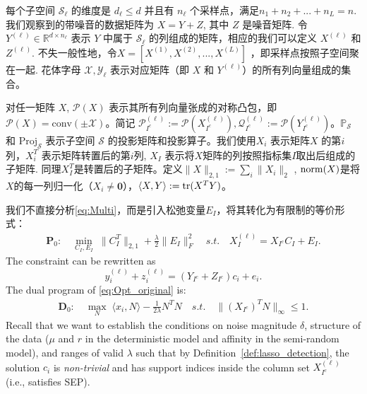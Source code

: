 \documentclass[main.tex]{subfiles}
\begin{document}
每个子空间 $\mathcal{S}_{\ell}$ 的维度是 $d_{\ell} \le d$ 并且有 $n_{\ell}$
个采样点，满足$n_1 +n_2+...+n_L=n$. 我们观察到的带噪音的数据矩阵为 $X = Y+Z$,
其中 $Z$ 是噪音矩阵. 令 $Y^{(\ell)}\in \mathbb{R}^{d\times n_{\ell}}$ 表示 
$Y$ 中属于 $\mathcal{S}_{\ell}$ 的列组成的矩阵，相应的我们可以定义 $X^{(\ell)}$ 和 $Z^{(\ell)}$.
不失一般性地，令$X=[X^{(1)},X^{(2)},...,X^{(L)}]$ ，即采样点按照子空间聚在一起.
花体字母 $\mathcal{X},\mathcal{Y_{\ell}}$ 表示对应矩阵（即 $X$ 和 $Y^{(\ell)}$）的所有列向量组成的集合。

对任一矩阵 $X$, $\mathcal{P}(X)$ 表示其所有列向量张成的对称凸包，即
$\mathcal{P}(X) = \mathrm{conv}(\pm \mathcal{X})$。简记
$\mathcal{P}_{I^c}^{(\ell)} := \mathcal{P}(X_{I^c}^{(\ell)}), \mathcal{Q}_{I^c}^{(\ell)} :=
\mathcal{P}(Y_{I^c}^{(\ell)})$。$\mathbb{P}_{\mathcal{S}}$ 和
$\mathrm{Proj}_{\mathcal{S}}$ 表示子空间 $\mathcal{S}$
的投影矩阵和投影算子。我们使用$X_i$ 表示矩阵$X$ 的第$i$列，$X_i^T$ 表示矩阵转置后的第$i$列, $X_I$
表示将$X$矩阵的列按照指标集$I$取出后组成的子矩阵.
同理$X^T_I$是转置后的子矩阵。定义$\|X\|_{2, 1}:= \sum_i \|X_i\|_2$ ,
$\mathrm{norm}(X)$是将$X$的每一列归一化（$X_i \neq \mathbf{0}$），$\langle X, Y \rangle
:= \mathrm{tr}(X^T Y)$。

我们不直接分析\eqref{eq:Multi}，而是引入松弛变量$E_I$，将其转化为有限制的等价形式：
\begin{align}\label{eq:Opt_original}
  \mathbf{P}_0:\quad \min_{C_I, E_I} \;
  \|C_I^T\|_{2,1}+\frac{\lambda}{2}\|E_I\|_F^2 \quad
  s.t. \quad X^{(\ell)}_I=X_{I^c}C_I+E_I.
\end{align}
The constraint can be rewritten as
\begin{equation}\label{eq:Opt_original_equi}
  y^{(\ell)}_i+z^{(\ell)}_i=(Y_{I^c}+Z_{I^c})c_i+e_i.
\end{equation}
The dual program of \eqref{eq:Opt_original} is:
\begin{equation}\label{eq:Opt_original_dual}
  \begin{aligned}
    \mathbf{D}_0:\quad \max_{N} \; \langle x_i,N \rangle - \frac{1}{2\lambda}N^TN \quad
    s.t. \quad \|(X_{I^c})^TN\|_{\infty} \leq 1.
  \end{aligned}
\end{equation}
Recall that we want to establish the conditions on noise magnitude $\delta$, structure of the data ($\mu$ and $r$ in the deterministic model and affinity in the semi-random model), and ranges of valid $\lambda$ such that by Definition~\ref{def:lasso_detection}, the solution $c_i$ is \emph{non-trivial} and has support indices inside the column set $X^{(\ell)}_{I^c}$ (i.e., satisfies SEP).
\end{document}
